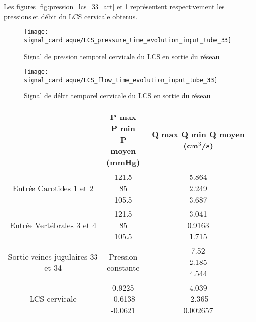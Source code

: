\documentclass[french]{report}
\begin{document}
Les figures \ref{fig:pression_lcs_33_art} et \ref{fig:débit_lcs_33_art} représentent respectivement les pressions et débit du LCS cervicale obtenus.

\begin{figure}
  \begin{minipage}{0.5\linewidth}
    \centering
    \texttt{[image: signal\_cardiaque/LCS\_pressure\_time\_evolution\_input\_tube\_33]}
    \caption{Signal de pression temporel cervicale du LCS en sortie du réseau}
    \label{fig:pression_lcs_33_art}
  \end{minipage}
  \hspace{0.5cm}
  \begin{minipage}{0.5\linewidth}
    \centering
    \texttt{[image: signal\_cardiaque/LCS\_flow\_time\_evolution\_input\_tube\_33]}
    \caption{Signal de débit temporel cervicale du LCS en sortie du réseau}
    \label{fig:débit_lcs_33_art}
  \end{minipage}
\end{figure}


\begin{center}
    \begin{tabular}{  c c  c }
      \hline
      \thead{} & \thead{P max \\ P min \\ P moyen \\ (mmHg)} & \thead{Q max \\ Q min \\Q moyen \\ (cm$^{3}$/s)} \\
      \hline
      Entrée Carotides 1 et 2 & \makecell{121.5 \\ 85 \\ 105.5} & \makecell{5.864 \\ 2.249 \\ 3.687} \\
      \hline
      Entrée Vertébrales 3 et 4 & \makecell{121.5 \\ 85 \\ 105.5} & \makecell{3.041 \\ 0.9163 \\ 1.715} \\     
      \hline
      Sortie veines jugulaires 33 et 34 & \makecell{Pression \\ constante} & \makecell{7.52 \\ 2.185 \\ 4.544} \\ 
      \hline
      LCS cervicale & \makecell{0.9225 \\ -0.6138 \\ -0.0621} & \makecell{4.039 \\ -2.365 \\ 0.002657} \\
      \hline
      \end{tabular}
\end{center}
    
\end{document}
